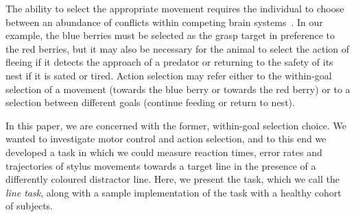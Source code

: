 \documentclass[10pt,letterpaper]{article}
\begin{document}
The
ability to select the appropriate movement requires the individual to
choose between an abundance of conflicts within competing brain
systems~\cite{redgrave_basal_1999}. In our example, the blue berries
must be selected as the grasp target in preference to the red berries,
but it may also be necessary for the animal to select the action of
fleeing if it detects the approach of a predator or returning to the
safety of its nest if it is sated or tired. Action selection may refer
either to the within-goal selection of a movement (towards the blue
berry or towards the red berry) or to a selection between different
goals (continue feeding or return to nest).

In this paper, we are concerned with the former, within-goal selection
choice. We wanted to investigate motor control and action selection,
and to this end we developed a task in which we could measure reaction
times, error rates and trajectories of stylus movements towards a
target line in the presence of a differently coloured distractor
line. Here, we present the task, which we call the \emph{line task},
along with a sample implementation of the task with a healthy cohort
of subjects.

%
%
%
\end{document}
